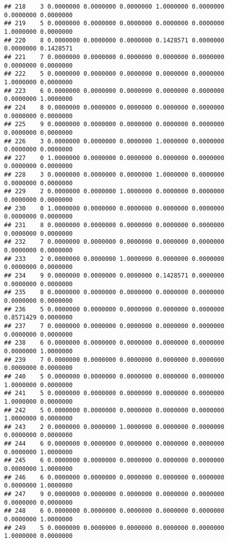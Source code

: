 \documentclass[
]{article}
\begin{document}
\begin{verbatim}
## 218    3 0.0000000 0.0000000 0.0000000 1.0000000 0.0000000 0.0000000 0.0000000
## 219    5 0.0000000 0.0000000 0.0000000 0.0000000 0.0000000 1.0000000 0.0000000
## 220    8 0.0000000 0.0000000 0.0000000 0.1428571 0.0000000 0.0000000 0.1428571
## 221    7 0.0000000 0.0000000 0.0000000 0.0000000 0.0000000 0.0000000 0.0000000
## 222    5 0.0000000 0.0000000 0.0000000 0.0000000 0.0000000 1.0000000 0.0000000
## 223    6 0.0000000 0.0000000 0.0000000 0.0000000 0.0000000 0.0000000 1.0000000
## 224    8 0.0000000 0.0000000 0.0000000 0.0000000 0.0000000 0.0000000 0.0000000
## 225    9 0.0000000 0.0000000 0.0000000 0.0000000 0.0000000 0.0000000 0.0000000
## 226    3 0.0000000 0.0000000 0.0000000 1.0000000 0.0000000 0.0000000 0.0000000
## 227    0 1.0000000 0.0000000 0.0000000 0.0000000 0.0000000 0.0000000 0.0000000
## 228    3 0.0000000 0.0000000 0.0000000 1.0000000 0.0000000 0.0000000 0.0000000
## 229    2 0.0000000 0.0000000 1.0000000 0.0000000 0.0000000 0.0000000 0.0000000
## 230    0 1.0000000 0.0000000 0.0000000 0.0000000 0.0000000 0.0000000 0.0000000
## 231    8 0.0000000 0.0000000 0.0000000 0.0000000 0.0000000 0.0000000 0.0000000
## 232    7 0.0000000 0.0000000 0.0000000 0.0000000 0.0000000 0.0000000 0.0000000
## 233    2 0.0000000 0.0000000 1.0000000 0.0000000 0.0000000 0.0000000 0.0000000
## 234    9 0.0000000 0.0000000 0.0000000 0.1428571 0.0000000 0.0000000 0.0000000
## 235    8 0.0000000 0.0000000 0.0000000 0.0000000 0.0000000 0.0000000 0.0000000
## 236    5 0.0000000 0.0000000 0.0000000 0.0000000 0.0000000 0.8571429 0.0000000
## 237    7 0.0000000 0.0000000 0.0000000 0.0000000 0.0000000 0.0000000 0.0000000
## 238    6 0.0000000 0.0000000 0.0000000 0.0000000 0.0000000 0.0000000 1.0000000
## 239    7 0.0000000 0.0000000 0.0000000 0.0000000 0.0000000 0.0000000 0.0000000
## 240    5 0.0000000 0.0000000 0.0000000 0.0000000 0.0000000 1.0000000 0.0000000
## 241    5 0.0000000 0.0000000 0.0000000 0.0000000 0.0000000 1.0000000 0.0000000
## 242    5 0.0000000 0.0000000 0.0000000 0.0000000 0.0000000 1.0000000 0.0000000
## 243    2 0.0000000 0.0000000 1.0000000 0.0000000 0.0000000 0.0000000 0.0000000
## 244    6 0.0000000 0.0000000 0.0000000 0.0000000 0.0000000 0.0000000 1.0000000
## 245    6 0.0000000 0.0000000 0.0000000 0.0000000 0.0000000 0.0000000 1.0000000
## 246    6 0.0000000 0.0000000 0.0000000 0.0000000 0.0000000 0.0000000 1.0000000
## 247    9 0.0000000 0.0000000 0.0000000 0.0000000 0.0000000 0.0000000 0.0000000
## 248    6 0.0000000 0.0000000 0.0000000 0.0000000 0.0000000 0.0000000 1.0000000
## 249    5 0.0000000 0.0000000 0.0000000 0.0000000 0.0000000 1.0000000 0.0000000

\end{verbatim}
\end{document}
